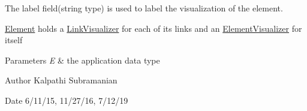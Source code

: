 The label field(string type) is used to label the visualization of the element.

\hyperlink{classbridges_1_1datastructure_1_1_element}{Element} holds a \hyperlink{classbridges_1_1datastructure_1_1_link_visualizer}{Link\+Visualizer} for each of its links and an \hyperlink{classbridges_1_1datastructure_1_1_element_visualizer}{Element\+Visualizer} for itself


\begin{DoxyParams}{Parameters}
{\em E} & the application data type\\
\hline
\end{DoxyParams}
\begin{DoxyAuthor}{Author}
Kalpathi Subramanian
\end{DoxyAuthor}
\begin{DoxyDate}{Date}
6/11/15, 11/27/16, 7/12/19 
\end{DoxyDate}
